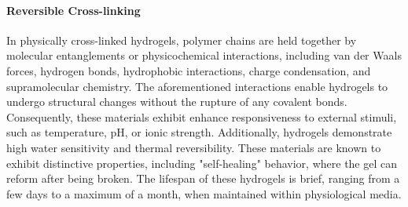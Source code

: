 \paragraph{Reversible Cross-linking}
In physically cross-linked hydrogels, polymer chains are held together by molecular entanglements or physicochemical interactions, including van der Waals forces, hydrogen bonds, hydrophobic interactions, charge condensation, and supramolecular chemistry\citep{bustamante-torresHydrogelsClassificationAccording2021}.
The aforementioned interactions enable hydrogels to undergo structural changes without the rupture of any covalent bonds. Consequently, these materials exhibit enhance responsiveness to external stimuli, such as temperature, pH, or ionic strength. Additionally, hydrogels demonstrate high water sensitivity and thermal reversibility\citep{bustamante-torresHydrogelsClassificationAccording2021,priyaComprehensiveReviewHydrogel2024}.
These materials are known to exhibit distinctive properties, including "self-healing" behavior, where the gel can reform after being broken.
The lifespan of these hydrogels is brief, ranging from a few days to a maximum of a month, when maintained within physiological media.

